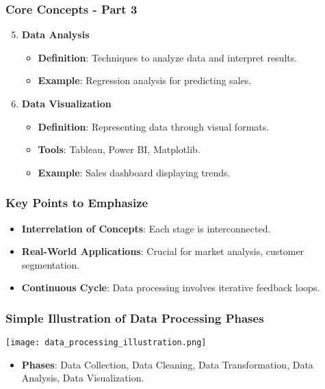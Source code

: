 \documentclass[aspectratio=169]{beamer}
\begin{document}
\begin{frame}[fragile]
    \frametitle{Core Concepts - Part 3}
    \begin{enumerate}
        \setcounter{enumi}{4} %
        
        \item \textbf{Data Analysis} 
        \begin{itemize}
            \item \textbf{Definition}: Techniques to analyze data and interpret results.
            \item \textbf{Example}: Regression analysis for predicting sales.
        \end{itemize}

        \item \textbf{Data Visualization} 
        \begin{itemize}
            \item \textbf{Definition}: Representing data through visual formats.
            \item \textbf{Tools}: Tableau, Power BI, Matplotlib.
            \item \textbf{Example}: Sales dashboard displaying trends.
        \end{itemize}
    \end{enumerate}
\end{frame}

\begin{frame}[fragile]
    \frametitle{Key Points to Emphasize}
    \begin{itemize}
        \item \textbf{Interrelation of Concepts}: Each stage is interconnected.
        \item \textbf{Real-World Applications}: Crucial for market analysis, customer segmentation.
        \item \textbf{Continuous Cycle}: Data processing involves iterative feedback loops.
    \end{itemize}
\end{frame}

\begin{frame}[fragile]
    \frametitle{Simple Illustration of Data Processing Phases}
    \begin{center}
        \texttt{[image: data\_processing\_illustration.png]}
    \end{center}
    \begin{itemize}
        \item \textbf{Phases}: Data Collection, Data Cleaning, Data Transformation, Data Analysis, Data Visualization.
    \end{itemize}
\end{frame}
\end{document}
